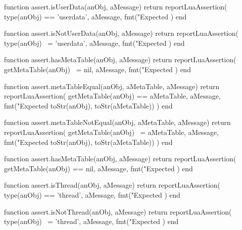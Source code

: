 \stopTestSuite


\startLuaCode
function assert.isUserData(anObj, aMessage)
  return reportLuaAssertion(
    type(anObj) == 'userdata',
    aMessage,
    fmt("Expected %
  )
end
\stopLuaCode
\stopTestSuite


\startLuaCode
function assert.isNotUserData(anObj, aMessage)
  return reportLuaAssertion(
    type(anObj) ~= 'userdata',
    aMessage,
    fmt("Expected %
  )
end
\stopLuaCode

\stopTestSuite


\startLuaCode
function assert.hasMetaTable(anObj, aMessage)
  return reportLuaAssertion(
    getMetaTable(anObj) ~= nil,
    aMessage,
    fmt("Expected %
  )
end
\stopLuaCode

\stopTestSuite


\startLuaCode
function assert.metaTableEqual(anObj, aMetaTable, aMessage)
  return reportLuaAssertion(
    getMetaTable(anObj) == aMetaTable,
    aMessage,
    fmt("Expected %
      toStr(anObj), toStr(aMetaTable))
  )
end
\stopLuaCode

\stopTestSuite


\startLuaCode
function assert.metaTableNotEqual(anObj, aMetaTable, aMessage)
  return reportLuaAssertion(
    getMetaTable(anObj) ~= aMetaTable,
    aMessage,
    fmt("Expected %
      toStr(anObj), toStr(aMetaTable))
  )
end
\stopLuaCode

\stopTestSuite


\startLuaCode
function assert.hasMetaTable(anObj, aMessage)
  return reportLuaAssertion(
    getMetaTable(anObj) == nil,
    aMessage,
    fmt("Expected %
  )
end
\stopLuaCode

\stopTestSuite


\startLuaCode
function assert.isThread(anObj, aMessage)
  return reportLuaAssertion(
    type(anObj) == 'thread',
    aMessage,
    fmt("Expected %
  )
end
\stopLuaCode

\stopTestSuite


\startLuaCode
function assert.isNotThread(anObj, aMessage)
  return reportLuaAssertion(
    type(anObj) ~= 'thread',
    aMessage,
    fmt("Expected %
  )
end
\stopLuaCode

\stopTestSuite

\stopchapter